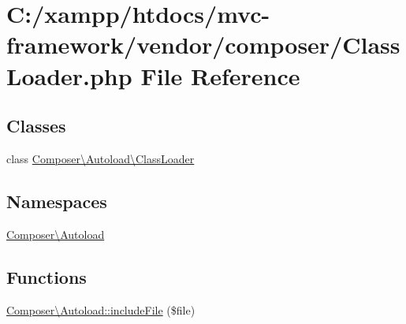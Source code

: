 \hypertarget{_class_loader_8php}{}\section{C\+:/xampp/htdocs/mvc-\/framework/vendor/composer/\+Class\+Loader.php File Reference}
\label{_class_loader_8php}
\subsection*{Classes}
\begin{DoxyCompactItemize}
\item 
class \hyperlink{class_composer_1_1_autoload_1_1_class_loader}{Composer\textbackslash{}\+Autoload\textbackslash{}\+Class\+Loader}
\end{DoxyCompactItemize}
\subsection*{Namespaces}
\begin{DoxyCompactItemize}
\item 
 \hyperlink{namespace_composer_1_1_autoload}{Composer\textbackslash{}\+Autoload}
\end{DoxyCompactItemize}
\subsection*{Functions}
\begin{DoxyCompactItemize}
\item 
\hyperlink{namespace_composer_1_1_autoload_a578ac7c710d884fb0ec5a8e6fd14d79f}{Composer\textbackslash{}\+Autoload\+::include\+File} (\$file)
\end{DoxyCompactItemize}
